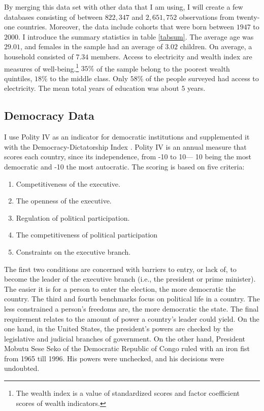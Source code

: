 \documentclass{wptemp}
\begin{document}
By merging this data set with other data that I am using, I will create a few databases consisting of between $822,347$ and $2,651,752$ observations from twenty-one countries. Moreover, the data include cohorts that were born between $1947$ to $2000$. I introduce the summary statistics in table \ref{tabsum}. The average age was $29.01$, and females in the sample had an average of $3.02$ children. On average, a household consisted of $7.34$ members. Access to electricity and wealth index are measures of well-being.\footnote{The wealth index is a value of standardized scores and factor coefficient scores of wealth indicators.} $35\%$ of the sample belong to the poorest wealth quintiles, $18\%$ to the middle class. Only $58\%$ of the people surveyed had access to electricity. The mean total years of education was about $5$ years.



\subsection{Democracy Data}
I use Polity IV \citep{marshall2019polity} as an indicator for democratic institutions and supplemented it with the Democracy-Dictatorship Index \citep{cheibub2010democracy}. Polity IV is an annual measure that scores each country, since its independence, from -10 to 10--- 10 being the most democratic and -10 the most autocratic. The scoring is based on five criteria: 
\begin{enumerate}
\item Competitiveness of the executive.
\item The openness of the executive.
\item Regulation of political participation. 
\item The competitiveness of political participation
\item Constraints on the executive branch. 
\end{enumerate}
The first two conditions are concerned with barriers to entry, or lack of, to become the leader of the executive branch (i.e., the president or prime minister). The easier it is for a person to enter the election, the more democratic the country. The third and fourth benchmarks focus on political life in a country. The less constrained a person's freedoms are, the more democratic the state. The final requirement relates to the amount of power a country's leader could yield. On the one hand, in the United States, the president's powers are checked by the legislative and judicial branches of government.
On the other hand, President Mobutu Sese Seko of the Democratic Republic of Congo ruled with an iron fist from 1965 till 1996. His powers were unchecked, and his decisions were undoubted. 
\end{document}
